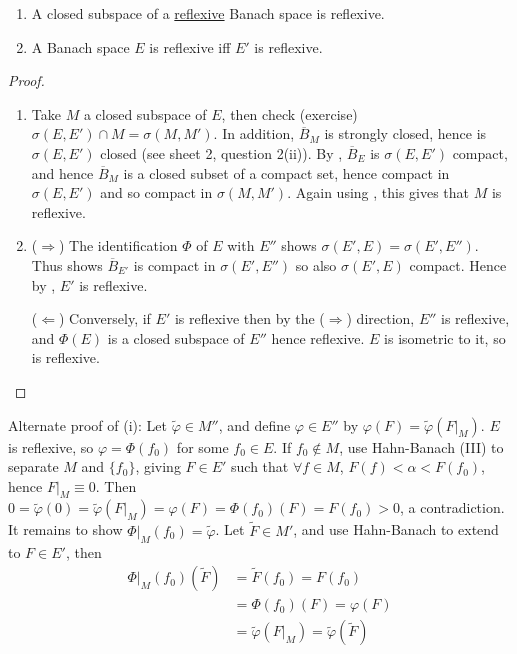 \documentclass[twoside]{article}
\begin{document}
\begin{cor}\leavevmode
    \begin{enumerate}[label=(\roman*)]
        \item A closed subspace of a \hyperlink{def:refl}{reflexive} Banach space is reflexive.
        \item A Banach space $E$ is reflexive iff $E'$ is reflexive.
    \end{enumerate}
\end{cor}
\begin{proof}\leavevmode
    \begin{enumerate}[label=(\roman*)]
        \item Take $M$ a closed subspace of $E$, then check (exercise) $\sigma(E, E') \cap M = \sigma(M, M')$.
            In addition, $\overline{B}_M$ is strongly closed, hence is $\sigma(E, E')$ closed (see sheet 2, question 2(ii)).
            By , $\overline{B}_E$ is $\sigma(E, E')$ compact, and hence $\overline{B}_M$ is a closed subset of a compact set, hence compact in $\sigma(E, E')$ and so compact in $\sigma(M, M')$.
            Again using , this gives that $M$ is reflexive.
        \item ($\Rightarrow$) The identification $\Phi$ of $E$ with $E''$ shows $\sigma(E', E) = \sigma(E', E'')$.
            Thus  shows $\overline{B}_{E'}$ is compact in $\sigma(E', E'')$ so also $\sigma(E', E)$ compact.
            Hence by , $E'$ is reflexive.

            ($\Leftarrow$) Conversely, if $E'$ is reflexive then by the ($\Rightarrow$) direction, $E''$ is reflexive, and $\Phi(E)$ is a closed subspace of $E''$ hence reflexive.
            $E$ is isometric to it, so is reflexive. \qedhere
    \end{enumerate}
\end{proof}

\color{gray}
\begin{remark}
  Alternate proof of (i): Let $\tilde{\varphi} \in M''$, and define $\varphi \in E''$ by $\varphi(F) = \tilde{\varphi}(F|_M)$.
  $E$ is reflexive, so $\varphi = \Phi(f_0)$ for some $f_0 \in E$.
  If $f_0 \notin M$, use Hahn-Banach (III) to separate $M$ and $\{f_0\}$, giving $F \in E'$ such that $\forall f \in M$, $F(f) < \alpha < F(f_0)$, hence $F|_M \equiv 0$.
  Then $0 = \tilde{\varphi}(0) = \tilde{\varphi}(F|_M) = \varphi(F) = \Phi(f_0)(F) = F(f_0) > 0$, a contradiction.
  It remains to show $\Phi|_M(f_0) = \tilde{\varphi}$. Let $\tilde{F} \in M'$, and use Hahn-Banach to extend to $F \in E'$, then
  \begin{align*}
    \Phi|_M(f_0)(\tilde{F}) &= \tilde{F}(f_0) = F(f_0)\\
                                  &= \Phi(f_0)(F) = \varphi(F) \\
                                  &= \tilde{\varphi}(F|_M) = \tilde{\varphi}(\tilde{F})
  \end{align*}
\end{remark}
\color{black}
\end{document}
